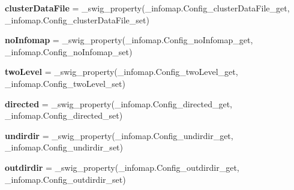 \begin{DoxyCompactItemize}
\mbox{\label{classdsmacc_1_1graph_1_1infomap_1_1infomap_1_1Config_ab6162000dab37e7370180df716551428}} 
{\bfseries cluster\+Data\+File} = \+\_\+swig\+\_\+property(\+\_\+infomap.\+Config\+\_\+cluster\+Data\+File\+\_\+get, \+\_\+infomap.\+Config\+\_\+cluster\+Data\+File\+\_\+set)
\item 
\mbox{\label{classdsmacc_1_1graph_1_1infomap_1_1infomap_1_1Config_a76c1e46634f4f47545f340de3f2c84fa}} 
{\bfseries no\+Infomap} = \+\_\+swig\+\_\+property(\+\_\+infomap.\+Config\+\_\+no\+Infomap\+\_\+get, \+\_\+infomap.\+Config\+\_\+no\+Infomap\+\_\+set)
\item 
\mbox{\label{classdsmacc_1_1graph_1_1infomap_1_1infomap_1_1Config_a298adfa148c819c20553a61768a85c4f}} 
{\bfseries two\+Level} = \+\_\+swig\+\_\+property(\+\_\+infomap.\+Config\+\_\+two\+Level\+\_\+get, \+\_\+infomap.\+Config\+\_\+two\+Level\+\_\+set)
\item 
\mbox{\label{classdsmacc_1_1graph_1_1infomap_1_1infomap_1_1Config_a812fe772e99d89c1b1e7ebfc84aae3e0}} 
{\bfseries directed} = \+\_\+swig\+\_\+property(\+\_\+infomap.\+Config\+\_\+directed\+\_\+get, \+\_\+infomap.\+Config\+\_\+directed\+\_\+set)
\item 
\mbox{\label{classdsmacc_1_1graph_1_1infomap_1_1infomap_1_1Config_af4b8b9cb389b68b56dbd1d2e98a8295f}} 
{\bfseries undirdir} = \+\_\+swig\+\_\+property(\+\_\+infomap.\+Config\+\_\+undirdir\+\_\+get, \+\_\+infomap.\+Config\+\_\+undirdir\+\_\+set)
\item 
\mbox{\label{classdsmacc_1_1graph_1_1infomap_1_1infomap_1_1Config_aac9a30825e4b32c4b90cb9ca31402dcc}} 
{\bfseries outdirdir} = \+\_\+swig\+\_\+property(\+\_\+infomap.\+Config\+\_\+outdirdir\+\_\+get, \+\_\+infomap.\+Config\+\_\+outdirdir\+\_\+set)
\item 
\mbox{\label{classdsmacc_1_1graph_1_1infomap_1_1infomap_1_1Config_a8cd65b3a30f679a4be508c59617d7046}} 

\end{DoxyCompactItemize}
